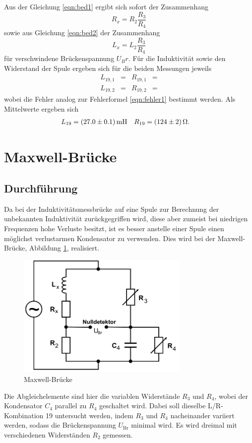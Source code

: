 Aus der Gleichung \ref{eqn:bed1} ergibt sich sofort der Zusammenhang
\begin{equation}
  R_x = R_2 \frac{R_3}{R_4}
\end{equation}
sowie aus Gleichung \ref{eqn:bed2} der Zusammenhang
\begin{equation}
  L_x = L_2 \frac{R_3}{R_4}
\end{equation}
für verschwindene Brückenspannung $U_Br$.
Für die Induktivität sowie den Widerstand der Spule ergeben sich für die beiden Messungen jeweils
\begin{align*}
  L_{19,1}   &=  & R_{19,1} &= \\
  L_{19,2}   &=  & R_{19,2} &= 
\end{align*}
wobei die Fehler analog zur Fehlerformel \ref{eqn:fehler1} bestimmt werden.
Als Mittelwerte ergeben sich
\begin{align*}
  L_{19}   &= \SI{27 +- 0.1}{\milli\henry} & R_{19} &= \SI{124 +- 2}{\ohm}.
\end{align*}

\section{Maxwell-Brücke}
\subsection{Durchführung}
Da bei der Induktivitätsmessbrücke auf eine Spule zur Berechnung der unbekannten Induktivität zurückgegriffen wird, diese aber zumeist bei niedrigen Frequenzen hohe Verluste besitzt, ist es besser anstelle einer Spule einen möglichst verlustarmen Kondensator zu verwenden.
Dies wird bei der Maxwell-Brücke, Abbildung \ref{fig:4}, realisiert.
\begin{figure}[H]
  \centering
  \includegraphics[height=6cm]{max.png}
  \caption{Maxwell-Brücke \cite{sample}}
  \label{fig:4}
\end{figure}
Die Abgleichelemente sind hier die variablen Widerstände $R_3$ und $R_4$, wobei der Kondensator $C_4$ parallel zu $R_4$ geschaltet wird.
Dabei soll dieselbe L/R-Kombination 19 untersucht werden, indem $R_3$ und $R_4$ nacheinander variiert werden, sodass die Brückenspannung $U_{\text{Br}}$ minimal wird.
Es wird dreimal mit verschiedenen Widerständen $R_2$ gemessen.
